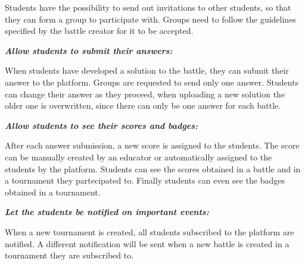 \documentclass{article}
\begin{document}
\begin{description}
\begin{description}
\begin{description}
                                \begin{description}
                                    \item Students have the possibility to send out invitations to other students, so that they can form a group to participate with. Groups need to follow the guidelines specified by the battle creator for it to be accepted.
                                \end{description}
                            \item[G6.2:] \textit{\textbf{Allow students to submit their answers:}}
                                \begin{description}
                                    \item When students have developed a solution to the battle, they can submit their answer to the platform. Groups are requested to send only one answer. Students can change their answer as they proceed, when uploading a new solution the older one is overwritten, since there can only be one answer for each battle. 
                                \end{description}
                            \item[G6.3:] \textit{\textbf{Allow students to see their scores and badges:}}
                                \begin{description}
                                    \item After each answer submission, a new score is assigned to the students. The score can be manually created by an educator or automatically assigned to the students by the platform. Students can see the scores obtained in a battle and in a tournament they partecipated to. Finally students can even see the badges obtained in a tournament.
                                \end{description}
                        \end{description}
                    \end{description}
                \item[G7:] \textit{\textbf{Let the students be notified on important events:}}
                    \begin{description}
                        \item When a new tournament is created, all students subscribed to the platform are notified. A different notification will be sent when a new battle is created in a tournament they are subscribed to.
                    \end{description}
            \end{description}
\end{document}
